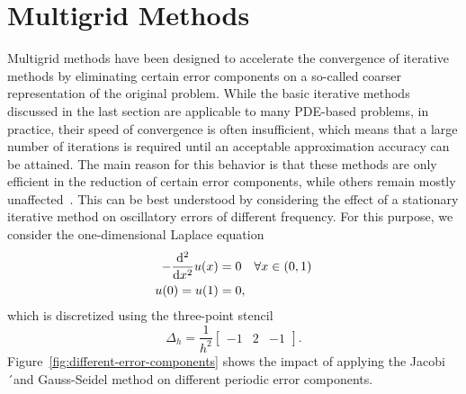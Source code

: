 \section{Multigrid Methods}\label{sec:multigrid-methods}
Multigrid methods have been designed to accelerate the convergence of iterative methods by eliminating certain error components on a so-called coarser representation of the original problem.
While the basic iterative methods discussed in the last section are applicable to many PDE-based problems, in practice, their speed of convergence is often insufficient, which means that a large number of iterations is required until an acceptable approximation accuracy can be attained. 
The main reason for this behavior is that these methods are only efficient in the reduction of certain error components, while others remain mostly unaffected~\cite{briggs2000multigrid}.
This can be best understood by considering the effect of a stationary iterative method on oscillatory errors of different frequency.
For this purpose, we consider the one-dimensional Laplace equation
\begin{equation}
		\begin{split}
			- \dv[2]{x} u(x) & = 0 \quad \forall x \in (0, 1) \\
			u(0) = u(1) & = 0,
		\end{split}
		\label{eq:1D-laplace-model}
\end{equation}
which is discretized using the three-point stencil
\begin{equation}
	\Delta_h = \frac{1}{h^2}\begin{bmatrix}
		-1 & 2 & -1
	\end{bmatrix}.
		\label{eq:1D-laplace-stencil}
\end{equation} 
Figure~\ref{fig:different-error-components} shows the impact of applying the Jacobi´and Gauss-Seidel method on different periodic error components.
